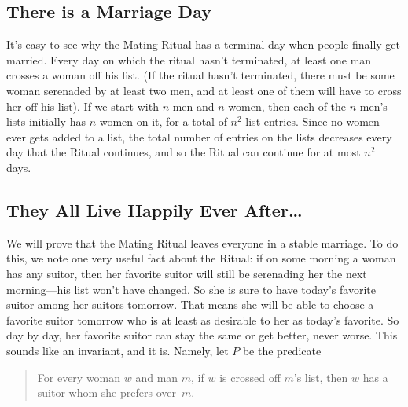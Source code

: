 
\subsection{There is a Marriage Day}

It's easy to see why the Mating Ritual has a terminal day when people
finally get married.  Every day on which the ritual hasn't terminated, at
least one man crosses a woman off his list.  (If the ritual hasn't
terminated, there must be some woman serenaded by at least two men, and at
least one of them will have to cross her off his list).  If we start with
$n$ men and $n$ women, then each of the $n$ men's lists initially has $n$
women on it, for a total of $n^2$ list entries.  Since no women ever gets
added to a list, the total number of entries on the lists decreases every
day that the Ritual continues, and so the Ritual can continue for at most
$n^2$ days.

\subsection{They All Live Happily Ever After\dots}\label{def:stable-invar}

We will prove that the Mating Ritual leaves everyone in a stable
marriage.  To do this, we note one very useful fact about the Ritual:
if on some morning a woman has any suitor, then her favorite suitor
will still be serenading her the next morning---his list won't have
changed.  So she is sure to have today's favorite suitor among her
suitors tomorrow.  That means she will be able to choose a favorite
suitor tomorrow who is at least as desirable to her as today's
favorite.  So day by day, her favorite suitor can stay the same or get
better, never worse.  This sounds like an invariant, and it is.  Namely,
let $P$ be the predicate
\begin{quote}
For every woman $w$ and man $m$, if $w$ is crossed off $m$'s list,
then $w$ has a suitor whom she prefers over~$m$.
\end{quote}

